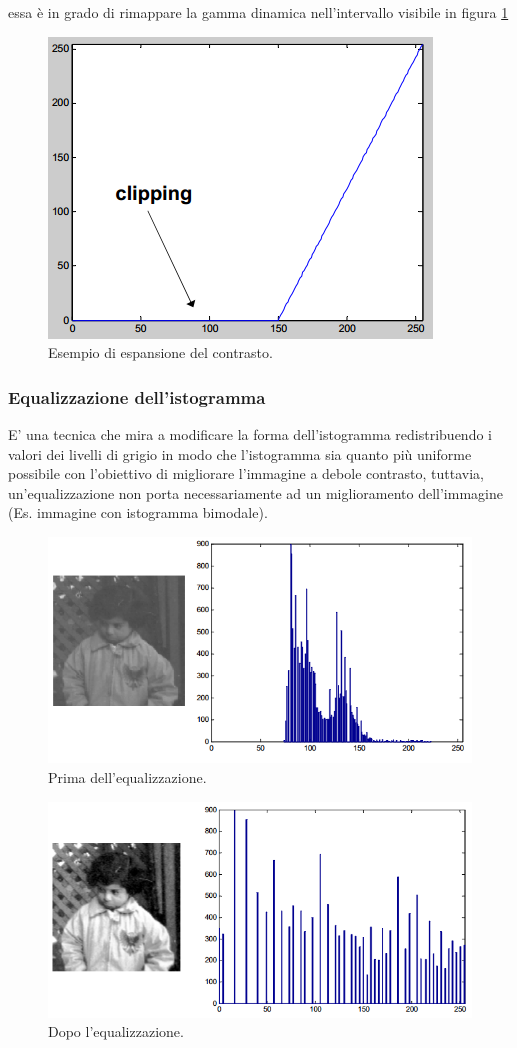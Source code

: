 essa è in grado di rimappare la gamma dinamica nell'intervallo visibile in figura \ref{fig:espansione-contrasto}

\begin{figure}
\centering
\includegraphics[width=.5\textwidth]{img/espansione-contrasto.png}
\caption{Esempio di espansione del contrasto.}\label{fig:espansione-contrasto}
\end{figure}

\subsubsection{Equalizzazione dell'istogramma}
E’ una tecnica che mira a modificare la forma 
dell’istogramma redistribuendo i valori dei 
livelli di grigio in modo che l’istogramma sia 
quanto più uniforme possibile con l’obiettivo  di migliorare l’immagine a 
debole contrasto, tuttavia, un’equalizzazione non porta 
necessariamente ad un miglioramento dell’immagine (Es. immagine con istogramma 
bimodale).
\begin{figure}
\centering
\includegraphics[width=.5\textwidth]{img/equalizzazione-prima.png}
\caption{Prima dell'equalizzazione.}
\label{fig:equalizzazione-prima}
\end{figure}

\begin{figure}
\centering
\includegraphics[width=.5\textwidth]{img/equalizzazione-dopo.png}
\caption{Dopo l'equalizzazione.}
\label{fig:equalizzazione-dopo.}
\end{figure}

